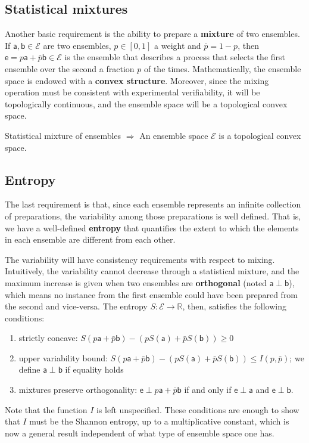 \documentclass[10pt,twocolumn, nofootinbib]{revtex4-2}
\newcommand{\ens}[1][e] {\mathsf{#1}} %
\newcommand{\Ens}[1][E] {\mathcal{#1}} %
\def\ortho{\perp}
\begin{document}
\subsection{Statistical mixtures}
Another basic requirement is the ability to prepare a \textbf{mixture} of two ensembles. If $\ens[a], \ens[b] \in \Ens$ are two ensembles, $p \in [0,1]$ a weight and $\bar{p} = 1-p$, then $\ens = p \ens[a] + \bar{p} \ens[b] \in \Ens$ is the ensemble that describes a process that selects the first ensemble over the second a fraction $p$ of the times. Mathematically, the ensemble space is endowed with a \textbf{convex structure}. Moreover, since the mixing operation must be consistent with experimental verifiability, it will be topologically continuous, and the ensemble space will be a topological convex space.

\begin{tcolorbox}[colback=white, colframe=black]
	Statistical mixture of ensembles $\Rightarrow$ An ensemble space $\Ens$ is a topological convex space.
\end{tcolorbox}

\subsection{Entropy}
The last requirement is that, since each ensemble represents an infinite collection of preparations, the variability among those preparations is well defined. That is, we have a well-defined \textbf{entropy} that quantifies the extent to which the elements in each ensemble are different from each other. 

The variability will have consistency requirements with respect to mixing. Intuitively, the variability cannot decrease through a statistical mixture, and the maximum increase is given when two ensembles are \textbf{orthogonal} (noted $\ens[a] \ortho \ens[b]$), which means no instance from the first ensemble could have been prepared from the second and vice-versa. The entropy $S : \Ens \to \mathbb{R}$, then, satisfies the following conditions:
\begin{enumerate}
	\item strictly concave: $S(p \ens[a] + \bar{p} \ens[b]) - (p S(\ens[a]) + \bar{p} S(\ens[b]) ) \geq 0$
	\item upper variability bound: $S(p \ens[a] + \bar{p} \ens[b]) - (p S(\ens[a]) + \bar{p} S(\ens[b]) ) \leq I(p,\bar{p})$; we define $\ens[a] \ortho \ens[b]$ if equality holds
	\item mixtures preserve orthogonality: $\ens \ortho p \ens[a] + \bar{p} \ens[b]$ if and only if $\ens \ortho \ens[a]$ and $\ens \ortho \ens[b]$.
\end{enumerate}
Note that the function $I$ is left unspecified. These conditions are enough to show that $I$ must be the Shannon entropy, up to a multiplicative constant, which is now a general result independent of what type of ensemble space one has.
\end{document}
